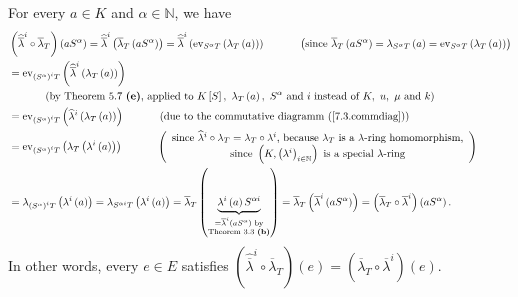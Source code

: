 \documentclass[12pt,final,notitlepage,onecolumn,german]{article}%
\begin{document}
For every $a\in K$ and $\alpha\in\mathbb{N}$, we have%
\begin{align*}
&  \left(  \widehat{\overline{\lambda}}^{i}\circ\overline{\lambda}_{T}\right)
\left(  aS^{\alpha}\right)  =\widehat{\overline{\lambda}}^{i}\left(
\overline{\lambda}_{T}\left(  aS^{\alpha}\right)  \right)  =\widehat
{\overline{\lambda}}^{i}\left(  \operatorname*{ev}\nolimits_{S^{\alpha}%
T}\left(  \lambda_{T}\left(  a\right)  \right)  \right)
\ \ \ \ \ \ \ \ \ \ \left(  \text{since }\overline{\lambda}_{T}\left(
aS^{\alpha}\right)  =\lambda_{S^{\alpha}T}\left(  a\right)
=\operatorname*{ev}\nolimits_{S^{\alpha}T}\left(  \lambda_{T}\left(  a\right)
\right)  \right) \\
&  =\operatorname*{ev}\nolimits_{\left(  S^{\alpha}\right)  ^{i}T}\left(
\widehat{\overline{\lambda}}^{i}\left(  \lambda_{T}\left(  a\right)  \right)
\right) \\
&  \ \ \ \ \ \ \ \ \ \ \left(  \text{by Theorem 5.7 \textbf{(e)}, applied to
}K\left[  S\right]  ,\text{ }\lambda_{T}\left(  a\right)  ,\text{ }S^{\alpha
}\text{ and }i\text{ instead of }K,\text{ }u,\text{ }\mu\text{ and }k\right)
\\
&  =\operatorname*{ev}\nolimits_{\left(  S^{\alpha}\right)  ^{i}T}\left(
\widehat{\lambda}^{i}\left(  \lambda_{T}\left(  a\right)  \right)  \right)
\ \ \ \ \ \ \ \ \ \ \left(  \text{due to the commutative diagramm
(\ref{7.3.commdiag})}\right) \\
&  =\operatorname*{ev}\nolimits_{\left(  S^{\alpha}\right)  ^{i}T}\left(
\lambda_{T}\left(  \lambda^{i}\left(  a\right)  \right)  \right)
\ \ \ \ \ \ \ \ \ \ \left(
\begin{array}
[c]{c}%
\text{since }\widehat{\lambda}^{i}\circ\lambda_{T}=\lambda_{T}\circ\lambda
^{i}\text{, because }\lambda_{T}\text{ is a }\lambda\text{-ring homomorphism,}%
\\
\text{since }\left(  K,\left(  \lambda^{i}\right)  _{i\in\mathbb{N}}\right)
\text{ is a special }\lambda\text{-ring}%
\end{array}
\right) \\
&  =\lambda_{\left(  S^{\alpha}\right)  ^{i}T}\left(  \lambda^{i}\left(
a\right)  \right)  =\lambda_{S^{\alpha i}T}\left(  \lambda^{i}\left(
a\right)  \right)  =\overline{\lambda}_{T}\left(  \underbrace{\lambda
^{i}\left(  a\right)  S^{\alpha i}}_{\substack{=\overline{\lambda}^{i}\left(
aS^{\alpha}\right)  \text{ by}\\\text{Theorem 3.3 \textbf{(b)}}}}\right)
=\overline{\lambda}_{T}\left(  \overline{\lambda}^{i}\left(  aS^{\alpha
}\right)  \right)  =\left(  \overline{\lambda}_{T}\circ\overline{\lambda}%
^{i}\right)  \left(  aS^{\alpha}\right)  .
\end{align*}
In other words, every $e\in E$ satisfies $\left(  \widehat{\overline{\lambda}%
}^{i}\circ\overline{\lambda}_{T}\right)  \left(  e\right)  =\left(
\overline{\lambda}_{T}\circ\overline{\lambda}^{i}\right)  \left(  e\right)  $.
\end{document}
